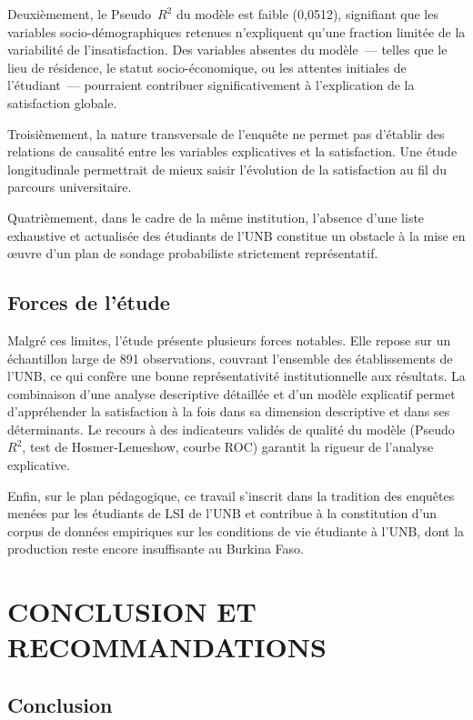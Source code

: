 \documentclass[
12pt,          %
a4paper,       %
oneside,      %
openright      %
]{report}          %
\begin{document}
		Deuxièmement, le Pseudo~$R^2$ du modèle est faible (0,0512), signifiant que les variables
		socio-démographiques retenues n'expliquent qu'une fraction limitée de la variabilité de
		l'insatisfaction. Des variables absentes du modèle~--- telles que le lieu de résidence,
		le statut socio-économique, ou les attentes initiales de l'étudiant~--- pourraient
		contribuer significativement à l'explication de la satisfaction globale.
		
		Troisièmement, la nature transversale de l'enquête ne permet pas d'établir des relations
		de causalité entre les variables explicatives et la satisfaction. Une étude longitudinale
		permettrait de mieux saisir l'évolution de la satisfaction au fil du parcours universitaire.

		Quatrièmement,  
		dans le cadre de
		la même institution, l'absence d'une liste exhaustive et actualisée des étudiants de
		l'UNB constitue un obstacle à la mise en œuvre d'un plan de sondage probabiliste
		strictement représentatif.
		
		\section{Forces de l'étude}
		
		Malgré ces limites, l'étude présente plusieurs forces notables. Elle repose sur un
		échantillon large de 891 observations, couvrant l'ensemble des établissements de l'UNB,
		ce qui confère une bonne représentativité institutionnelle aux résultats. La combinaison
		d'une analyse descriptive détaillée et d'un modèle explicatif permet d'appréhender la
		satisfaction à la fois dans sa dimension descriptive et dans ses déterminants. Le recours
		à des indicateurs validés de qualité du modèle (Pseudo~$R^2$, test de Hosmer-Lemeshow,
		courbe ROC) garantit la rigueur de l'analyse explicative.
		
		Enfin, sur le plan pédagogique, ce travail s'inscrit dans la tradition des enquêtes
		menées par les étudiants de LSI de l'UNB et contribue à la constitution d'un corpus de données empiriques
		sur les conditions de vie étudiante à l'UNB, dont la production reste encore insuffisante
		au Burkina Faso.
		
		\chapter{CONCLUSION ET RECOMMANDATIONS}
	\section{Conclusion}
	
\end{document}
